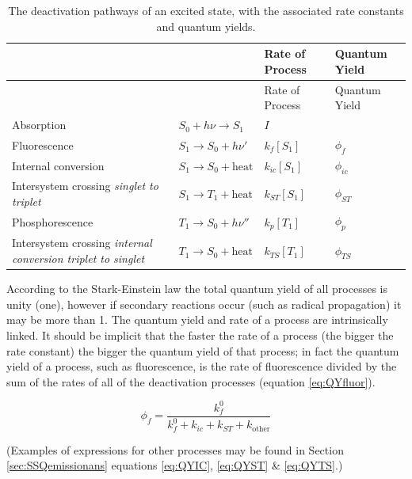 \documentclass[
]{book}
\begin{document}
\begin{longtable}[]{@{}
  >{\raggedright\arraybackslash}p{}
  >{\raggedright\arraybackslash}p{}
  >{\raggedright\arraybackslash}p{}
  >{\raggedright\arraybackslash}p{}@{}}
\caption{\label{tab:QYtab} The deactivation pathways of an excited state, with the associated rate constants and quantum yields.}\tabularnewline
\toprule
& & Rate of Process & Quantum Yield \\
\midrule
\endfirsthead
\toprule
& & Rate of Process & Quantum Yield \\
\midrule
\endhead
Absorption & \(S_0 + h \nu \longrightarrow S_1\) & \(I\) & \\
Fluorescence & \(S_1 \longrightarrow S_0 + h \nu'\) & \(k_f[S_1]\) & \(\phi _f\) \\
Internal conversion & \(S_1 \longrightarrow S_0 + \textrm{heat}\) & \(k_{ic}[S_1]\) & \(\phi _{ic}\) \\
Intersystem crossing \emph{singlet to triplet} & \(S_1 \longrightarrow T_1 + \textrm{heat}\) & \(k_{ST}[S_1]\) & \(\phi _{ST}\) \\
Phosphorescence & \(T_1 \longrightarrow S_0 + h \nu''\) & \(k_p[T_1]\) & \(\phi _p\) \\
Intersystem crossing \emph{internal conversion triplet to singlet} & \(T_1 \longrightarrow S_0 + \textrm{heat}\) & \(k_{TS}[T_1]\) & \(\phi _{TS}\) \\
\bottomrule
\end{longtable}

According to the Stark-Einstein law the total quantum yield of all processes is unity (one), however if secondary reactions occur (such as radical propagation) it may be more than 1. The quantum yield and rate of a process are intrinsically linked. It should be implicit that the faster the rate of a process (the bigger the rate constant) the bigger the quantum yield of that process; in fact the quantum yield of a process, such as fluorescence, is the rate of fluorescence divided by the sum of the rates of all of the deactivation processes (equation \eqref{eq:QYfluor}).

\begin{equation}
\phi_f = \frac{k_f^0}{k_f^0+k_{ic}+ k_{ST}+k_{\textrm{other}}}
\label{eq:QYfluor}
\end{equation}

(Examples of expressions for other processes may be found in Section \ref{sec:SSQemissionans} equations \eqref{eq:QYIC}, \eqref{eq:QYST} \& \eqref{eq:QYTS}.)
\end{document}
